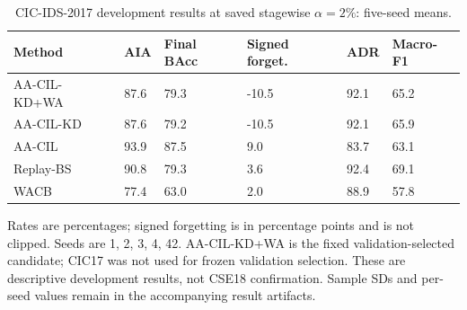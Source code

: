 \begin{table}[t]
\centering\scriptsize
\setlength{\tabcolsep}{3.8pt}
\caption{CIC-IDS-2017 development results at saved stagewise $\alpha=2\%$: five-seed means.}\label{tab:cic-retention-development}
\begin{tabular}{llllll}
\toprule
Method & AIA & Final BAcc & Signed forget. & ADR & Macro-F1 \\
\midrule
AA-CIL-KD+WA & 87.6 & 79.3 & -10.5 & 92.1 & 65.2 \\
AA-CIL-KD & 87.6 & 79.2 & -10.5 & 92.1 & 65.9 \\
AA-CIL & 93.9 & 87.5 & 9.0 & 83.7 & 63.1 \\
Replay-BS & 90.8 & 79.3 & 3.6 & 92.4 & 69.1 \\
WACB & 77.4 & 63.0 & 2.0 & 88.9 & 57.8 \\
\bottomrule
\end{tabular}
\par\vspace{2pt}\begin{minipage}{.98\linewidth}\footnotesize Rates are percentages; signed forgetting is in percentage points and is not clipped. Seeds are 1, 2, 3, 4, 42. AA-CIL-KD+WA is the fixed validation-selected candidate; CIC17 was not used for frozen validation selection. These are descriptive development results, not CSE18 confirmation. Sample SDs and per-seed values remain in the accompanying result artifacts.\end{minipage}
\end{table}
